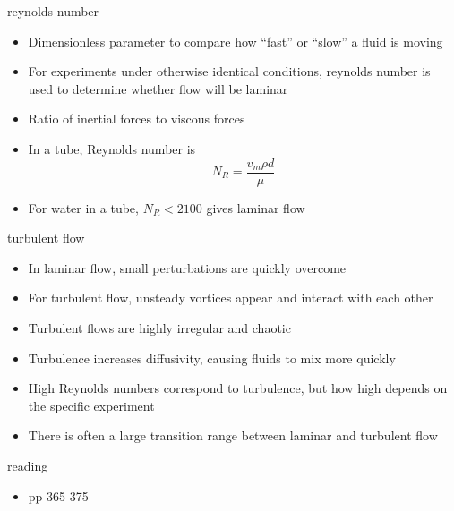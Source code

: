 \documentclass[12pt,handout]{beamer}
\providecommand{\tightlist}{%
  \setlength{\itemsep}{0pt}\setlength{\parskip}{0pt}}
\providecommand{\tightlist}{%
\setlength{\itemsep}{0pt}\setlength{\parskip}{0pt}}
\begin{document}
\begin{frame}{reynolds number}
\protect\hypertarget{reynolds-number}{}
\begin{itemize}
\item
  Dimensionless parameter to compare how ``fast'' or ``slow'' a fluid is
  moving
\item
  For experiments under otherwise identical conditions, reynolds number
  is used to determine whether flow will be laminar
\item
  Ratio of inertial forces to viscous forces
\item
  In a tube, Reynolds number is \[N_R = \frac{v_m \rho d}{\mu}\]
\item
  For water in a tube, \(N_R < 2100\) gives laminar flow
\end{itemize}
\end{frame}

\begin{frame}{turbulent flow}
\protect\hypertarget{turbulent-flow}{}
\begin{itemize}
\tightlist
\item
  In laminar flow, small perturbations are quickly overcome
\item
  For turbulent flow, unsteady vortices appear and interact with each
  other
\item
  Turbulent flows are highly irregular and chaotic
\item
  Turbulence increases diffusivity, causing fluids to mix more quickly
\item
  High Reynolds numbers correspond to turbulence, but how high depends
  on the specific experiment
\item
  There is often a large transition range between laminar and turbulent
  flow
\end{itemize}
\end{frame}

\begin{frame}{reading}
\protect\hypertarget{reading}{}
\begin{itemize}
\tightlist
\item
  pp 365-375
\end{itemize}
\end{frame}
\end{document}

